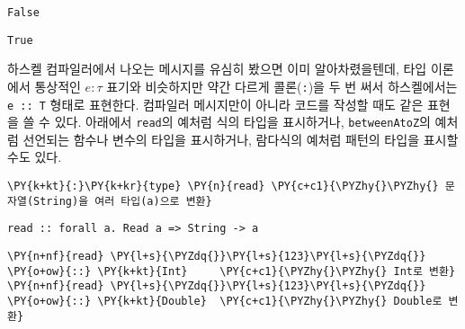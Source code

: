     \begin{Verbatim}[commandchars=\\\{\}]
False
    \end{Verbatim}

    
    
    \begin{Verbatim}[commandchars=\\\{\}]
True
    \end{Verbatim}

    
    하스켈 컴파일러에서 나오는 메시지를 유심히 봤으면 이미 알아차렸을텐데,
타입 이론에서 통상적인 \(e:\tau\) 표기와 비슷하지만 약간 다르게
콜론(\texttt{:})을 두 번 써서 하스켈에서는 \texttt{e\ ::\ T} 형태로
표현한다. 컴파일러 메시지만이 아니라 코드를 작성할 때도 같은 표현을 쓸
수 있다. 아래에서 \texttt{read}의 예처럼 식의 타입을 표시하거나,
\texttt{betweenAtoZ}의 예처럼 선언되는 함수나 변수의 타입을 표시하거나,
람다식의 예처럼 패턴의 타입을 표시할 수도 있다.

    \begin{tcolorbox}[breakable, size=fbox, boxrule=1pt, pad at break*=1mm,colback=cellbackground, colframe=cellborder, top=.75ex]
\begin{Verbatim}[commandchars=\\\{\}]
\PY{k+kt}{:}\PY{k+kr}{type} \PY{n}{read} \PY{c+c1}{\PYZhy{}\PYZhy{} 문자열(String)을 여러 타입(a)으로 변환}
\end{Verbatim}
\end{tcolorbox}

    
    \begin{Verbatim}[commandchars=\\\{\}]
read :: forall a. Read a => String -> a
    \end{Verbatim}

    
    \begin{tcolorbox}[breakable, size=fbox, boxrule=1pt, pad at break*=1mm,colback=cellbackground, colframe=cellborder, top=.75ex]
\begin{Verbatim}[commandchars=\\\{\}]
\PY{n+nf}{read} \PY{l+s}{\PYZdq{}}\PY{l+s}{123}\PY{l+s}{\PYZdq{}} \PY{o+ow}{::} \PY{k+kt}{Int}     \PY{c+c1}{\PYZhy{}\PYZhy{} Int로 변환}
\PY{n+nf}{read} \PY{l+s}{\PYZdq{}}\PY{l+s}{123}\PY{l+s}{\PYZdq{}} \PY{o+ow}{::} \PY{k+kt}{Double}  \PY{c+c1}{\PYZhy{}\PYZhy{} Double로 변환}
\end{Verbatim}
\end{tcolorbox}

